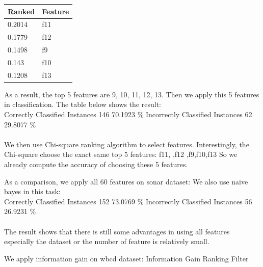 \documentclass[11pt, a4paper, oneside, openright]{article}
\begin{document}
\begin{table}[H]
\begin{tabular}{|l|l|}
\hline
\multicolumn{1}{|c|}{\textbf{Ranked}} & \multicolumn{1}{c|}{\textbf{Feature}} \\
\hline
0.2014    &f11                                     \\
\hline
0.1779    &f12                                \\
\hline
0.1498  &f9                                             \\
\hline
0.143   &f10                                             \\
\hline
0.1208   &f13                                             \\
\hline
\end{tabular}
\end{table}


As a result,  the top 5 features are 9, 10, 11, 12, 13. Then we apply this 5 features in classification. The table below shows the result:
\\
\newline Correctly Classified Instances      \hspace * {4mm}   146       \hspace * {4mm}        70.1923 \%
\newline Incorrectly Classified Instances    \hspace * {4mm}    62   \hspace * {4mm}            29.8077 \%
\\
\\
We then use Chi-square ranking algorithm to select features. Interestingly, the Chi-square choose the exact same top 5 features: f11, ,f12 ,f9,f10,f13
So we already compute the accuracy of choosing these 5 features.

As a comparison, we apply all 60 features on sonar dataset:
We also use naive bayes in this task:
\\
\newline Correctly Classified Instances     \hspace * {4mm}    152      \hspace * {4mm}         73.0769 \%
\newline Incorrectly Classified Instances   \hspace * {4mm}     56       \hspace * {4mm}        26.9231 \%
\\
\\
The result shows that there is still some advantages in using all features especially the dataset or the number of feature is relatively small.

We apply information gain on wbcd dataset:
Information Gain Ranking Filter
\end{document}
